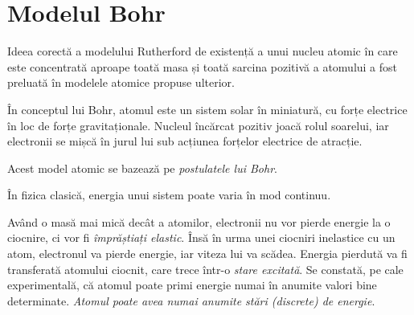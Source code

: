 \section{Modelul Bohr}

Ideea corectă a modelului Rutherford de existență a unui nucleu atomic în care
este concentrată aproape toată masa și toată sarcina pozitivă a atomului a fost
preluată în modelele atomice propuse ulterior.

În conceptul lui Bohr, atomul este un sistem solar în miniatură, cu forțe
electrice în loc de forțe gravitaționale. Nucleul încărcat pozitiv joacă rolul
soarelui, iar electronii se mișcă în jurul lui sub acțiunea forțelor electrice
de atracție.

Acest model atomic se bazează pe \emph{postulatele lui Bohr}.

În fizica clasică, energia unui sistem poate varia în mod continuu.

Având o masă mai mică decât a atomilor, electronii nu vor pierde energie la o
ciocnire, ci vor fi \emph{împrăștiați elastic}. Însă în urma unei ciocniri
inelastice cu un atom, electronul va pierde energie, iar viteza lui va scădea.
Energia pierdută va fi transferată atomului ciocnit, care trece într-o
\emph{stare excitată}. Se constată, pe cale experimentală, că atomul poate
primi energie numai în anumite valori bine determinate.
\emph{Atomul poate avea numai anumite stări (discrete) de energie}.
